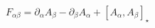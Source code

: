 \begin{equation}
 F_{\alpha\beta}=\partial_\alpha A_\beta -\partial_\beta A_\alpha+
[A_\alpha,A_\beta]_\star
\end{equation}

